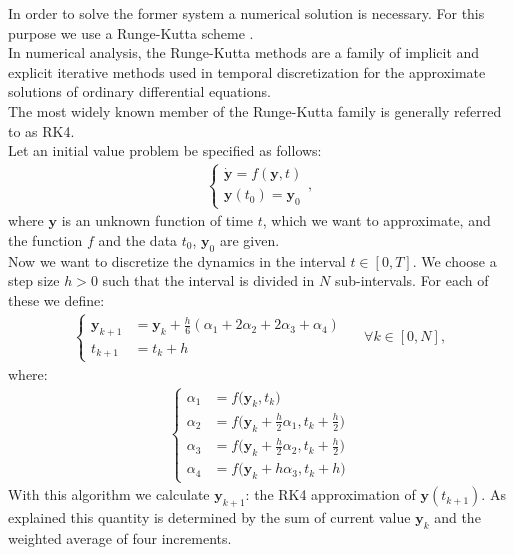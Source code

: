 In order to solve the former system a numerical solution is necessary. For this purpose we use a Runge-Kutta scheme  \cite{wiki_runge_kutta}.\\
In numerical analysis, the Runge-Kutta methods are a family of implicit and explicit iterative methods used in temporal discretization for the approximate solutions of ordinary differential equations.\\
The most widely known member of the Runge-Kutta family is generally referred to as RK4.\\
Let an initial value problem be specified as follows:
\begin{align}
\begin{cases}
\boldsymbol{\dot {y}} =f(\boldsymbol{y},t) \\[10pt]
\boldsymbol{y}(t_{0}) =\boldsymbol{y}_{0}
\end{cases},
\end{align}
where $\boldsymbol{y}$ is an unknown function of time $t$, which we want to approximate, and the function $f$ and the data $t_{0}$, $\boldsymbol{y}_{0}$ are given.\\
Now we want to discretize the dynamics in the interval $t \in [0,T]$. We choose a step size $h > 0$ such that the interval is divided in $N$ sub-intervals. For each of these we define:
\begin{align}
\begin{cases}
\boldsymbol{y}_{k+1}&=\boldsymbol{y}_{k}+{\tfrac {h}{6}}\left(\alpha_{1}+2\alpha_{2}+2\alpha_{3}+\alpha_{4}\right)\\[10pt]
t_{k+1}&=t_{k}+h
\end{cases} \ \ \ \ \ \  \forall k \in [0,N] ,
\end{align}
where:
\begin{align}
\begin{cases}
\alpha_{1}&=f\Big(\boldsymbol{y}_{k},t_{k}\Big)\\[10pt]
\alpha_{2}&=f\Big(\boldsymbol{y}_{k}+{\frac {h}{2}}\alpha_{1},t_{k}+{\frac {h}{2}}\Big)\\[10pt]
\alpha_{3}&=f\Big(\boldsymbol{y}_{k}+{\frac {h}{2}}\alpha_{2},t_{k}+{\frac {h}{2}}\Big)\\[10pt]
\alpha_{4}&=f\Big(\boldsymbol{y}_{k}+h\alpha_{3},t_{k}+h\Big)
\end{cases}
\end{align}
With this algorithm we calculate  $\boldsymbol{y}_{k+1}$: the RK4 approximation of $\boldsymbol{y}(t_{k+1})$. As explained this quantity is determined by the sum of current value $\boldsymbol{y}_{k}$ and the weighted average of four increments.

